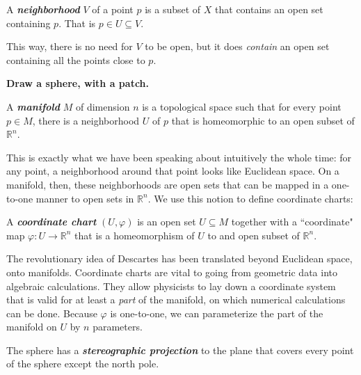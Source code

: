\documentclass[../master.tex]{subfiles}
\begin{document}
	\begin{defn}[Neighborhood]\label{def:Neighborhood}
		A \textbf{\emph{neighborhood}} $V$ of a point $p$ is a subset of $X$ that contains an open set containing $p$. That is $p \in U \subseteq V$.
	\end{defn}
	
	This way, there is no need for $V$ to be open, but it does \emph{contain} an open set containing all the points close to $p$.
	
	\textbf{Draw a sphere, with a patch.}
	
	\begin{defn}\label{def:Manifold}
		A \textbf{\emph{manifold}} $M$ of dimension $n$ is a topological space such that for every point $p \in M$, there is a neighborhood $U$ of $p$ that is homeomorphic to an open  subset of $\mathbb{R}^n$.
	\end{defn}
	
	This is exactly what we have been speaking about intuitively the whole time: for any point, a neighborhood around that point looks like Euclidean space. On a manifold, then, these neighborhoods are open sets that can be mapped in a one-to-one manner to open sets in $\mathbb{R}^n$. We use this notion to define coordinate charts: 
	
	\begin{defn}\label{def:coordinate_charts}
		A \textbf{\emph{coordinate chart}} $(U, \varphi)$ is an open set $U \subseteq M$ together with a ``coordinate" map $\varphi: U \rightarrow \mathbb{R}^n$ that is a homeomorphism of $U$ to and open subset of $\mathbb{R}^n$.
	\end{defn}
	
	The revolutionary idea of Descartes has been translated beyond Euclidean space, onto manifolds. Coordinate charts are vital to going from geometric data into algebraic calculations. They allow physicists to lay down a coordinate system that is valid for at least a \emph{part} of the manifold, on which numerical calculations can be done. Because $\varphi$ is one-to-one, we can parameterize the part of the manifold on $U$ by $n$ parameters.
	
	\begin{example}
		The sphere has a \textbf{\emph{stereographic projection}} to the plane that covers every point of the sphere except the north pole. 
	\end{example}
	
\end{document}
